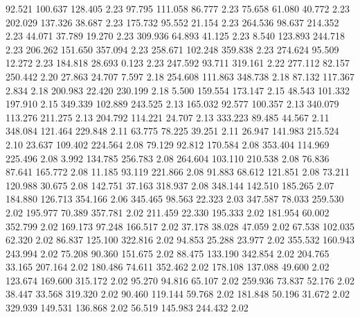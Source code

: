   92.521  100.637  128.405         2.23
  97.795  111.058   86.777         2.23
  75.658   61.080   40.772         2.23
 202.029  137.326   38.687         2.23
 175.732   95.552   21.154         2.23
 264.536   98.637  214.352         2.23
  44.071   37.789   19.270         2.23
 309.936   64.893   41.125         2.23
   8.540  123.893  244.718         2.23
 206.262  151.650  357.094         2.23
 258.671  102.248  359.838         2.23
 274.624   95.509   12.272         2.23
 184.818   28.693    0.123         2.23
 247.592   93.711  319.161         2.22
 277.112   82.157  250.442         2.20
  27.863   24.707    7.597         2.18
 254.608  111.863  348.738         2.18
  87.132  117.367    2.834         2.18
 200.983   22.420  230.199         2.18
   5.500  159.554  173.147         2.15
  48.543  101.332  197.910         2.15
 349.339  102.889  243.525         2.13
 165.032   92.577  100.357         2.13
 340.079  113.276  211.275         2.13
 204.792  114.221   24.707         2.13
 333.223   89.485   44.567         2.11
 348.084  121.464  229.848         2.11
  63.775   78.225   39.251         2.11
  26.947  141.983  215.524         2.10
  23.637  109.402  224.564         2.08
  79.129   92.812  170.584         2.08
 353.404  114.969  225.496         2.08
   3.992  134.785  256.783         2.08
 264.604  103.110  210.538         2.08
  76.836   87.641  165.772         2.08
  11.185   93.119  221.866         2.08
  91.883   68.612  121.851         2.08
  73.211  120.988   30.675         2.08
 142.751   37.163  318.937         2.08
 348.144  142.510  185.265         2.07
 184.880  126.713  354.166         2.06
 345.465   98.563   22.323         2.03
 347.587   78.033  259.530         2.02
 195.977   70.389  357.781         2.02
 211.459   22.330  195.333         2.02
 181.954   60.002  352.799         2.02
 169.173   97.248  166.517         2.02
  37.178   38.028   47.059         2.02
  67.538  102.035   62.320         2.02
  86.837  125.100  322.816         2.02
  94.853   25.288   23.977         2.02
 355.532  160.943  243.994         2.02
  75.208   90.360  151.675         2.02
  88.475  133.190  342.854         2.02
 204.765   33.165  207.164         2.02
 180.486   74.611  352.462         2.02
 178.108  137.088   49.600         2.02
 123.674  169.600  315.172         2.02
  95.270   94.816   65.107         2.02
 259.936   73.837   52.176         2.02
  38.447   33.568  319.320         2.02
  90.460  119.144   59.768         2.02
 181.848   50.196   31.672         2.02
 329.939  149.531  136.868         2.02
  56.519  145.983  244.432         2.02
